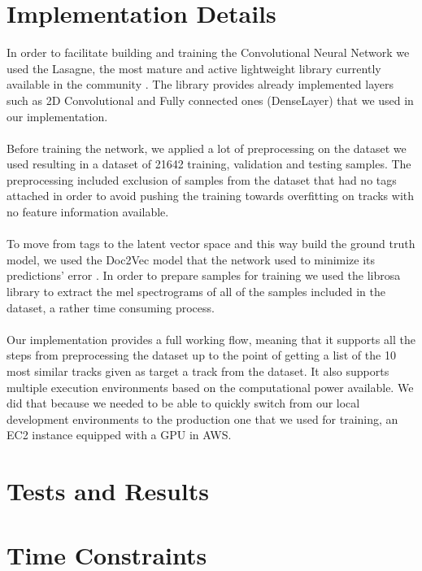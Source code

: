 \documentclass[11pt, a4paper]{article}
\begin{document}
  \section{Implementation Details}
    In order to facilitate building and training the Convolutional Neural
    Network we used the Lasagne, the most mature and active lightweight library
    currently available in the community \cite{lasagne}. The library provides
    already implemented layers such as 2D Convolutional and Fully connected
    ones (DenseLayer) that we used in our implementation.
    \\ \\
    \noindent
    Before training the network, we applied a lot of preprocessing on the
    dataset we used resulting in a dataset of 21642 training, validation and 
    testing samples. The preprocessing included exclusion of samples from the
    dataset that had no tags attached in order to avoid pushing the training
    towards overfitting on tracks with no feature information available.
    \\ \\
    \noindent
    To move from tags to the latent vector space and this way build the ground
    truth model, we used the Doc2Vec model that the network used to minimize
    its predictions' error \cite{doc2vec}. In order to prepare samples for
    training we used the librosa library \cite{librosa} to extract the mel
    spectrograms of all of the samples included in the dataset, a rather time
    consuming process.
    \\ \\
    \noindent
    Our implementation provides a full working flow, meaning that it supports
    all the steps from preprocessing the dataset up to the point of getting
    a list of the 10 most similar tracks given as target a track from the
    dataset. It also supports multiple execution environments based on the
    computational power available. We did that because we needed to be able to
    quickly switch from our local development environments to the production
    one that we used for training, an EC2 instance equipped with a GPU in AWS.
      
  \section{Tests and Results}

  \section{Time Constraints}
\end{document}

